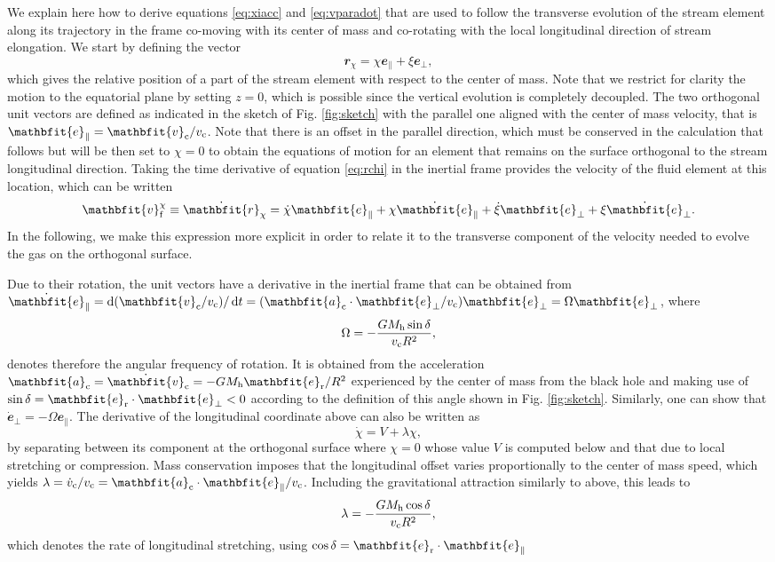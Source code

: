 \documentclass[a4paper,fleqn,usenatbib]{mnras}
\newcommand{\be}{\begin{equation}}
\newcommand{\ee}{\end{equation}}
\newcommand*\diff{\mathop{}\!\mathrm{d}}
\newcommand{\vect}[1]{\mathbfit{#1}}
\newcommand{\mh}{M_{\rm h}}
\begin{document}
We explain here how to derive equations \eqref{eq:xiacc} and \eqref{eq:vparadot} that are used to follow the transverse evolution of the stream element along its trajectory in the frame co-moving with its center of mass and co-rotating with the local longitudinal direction of stream elongation. We start by defining the vector
\be
\vect{r}_{\chi} = \chi \vect{e}_{\parallel} + \xi \vect{e}_{\perp},
\label{eq:rchi}
\ee
which gives the relative position of a part of the stream element with respect to the center of mass. Note that we restrict for clarity the motion to the equatorial plane by setting $z=0$, which is possible since the vertical evolution is completely decoupled. The two orthogonal unit vectors are defined as indicated in the sketch of Fig. \ref{fig:sketch} with the parallel one aligned with the center of mass velocity, that is $\vect{e}_{\parallel} = \vect{v}_{\rm c} / v_{\rm c}$. Note that there is an offset in the parallel direction, which must be conserved in the calculation that follows but will be then set to $\chi = 0$ to obtain the equations of motion for an element that remains on the surface orthogonal to the stream longitudinal direction. Taking the time derivative of equation \eqref{eq:rchi} in the inertial frame provides the velocity of the fluid element at this location, which can be written
\be
\vect{v}^{\chi}_{\rm f} \equiv \dot{\vect{r}}_{\chi} = \dot{\chi} \vect{e}_{\parallel} + \chi \dot{\vect{e}}_{\parallel} +  \dot{\xi} \vect{e}_{\perp} + \xi \dot{\vect{e}}_{\perp}.
\label{eq:vchif}
\ee
In the following, we make this expression more explicit in order to relate it to the transverse component of the velocity needed to evolve the gas on the orthogonal surface.

Due to their rotation, the unit vectors have a derivative in the inertial frame that can be obtained from $\dot{\vect{e}}_{\parallel} = \diff (\vect{v}_{\rm c} / v_{\rm c}) / \diff t =  (\vect{a}_{\rm c} \cdot \vect{e}_{\perp} / v_{\rm c}) \vect{e}_{\perp} = \Omega \vect{e}_{\perp}$, where 
\be
\Omega = -\frac{G \mh \sin \delta}{v_{\rm c} R^2},
\label{eq:omega}
\ee
denotes therefore the angular frequency of rotation. It is obtained from the acceleration $\vect{a}_{\rm c} = \dot{\vect{v}}_{\rm c} = -G \mh \vect{e}_{\rm r} / R^2$ experienced by the center of mass from the black hole and making use of $\sin \delta = \vect{e}_{\rm r}\cdot \vect{e}_{\perp}<0$ according to the definition of this angle shown in Fig. \ref{fig:sketch}. Similarly, one can show that $\dot{\vect{e}}_{\perp} = - \Omega \vect{e}_{\parallel}$. The derivative of the longitudinal coordinate above can also be written as
\be
\dot{\chi} = V + \lambda \chi,
\label{eq:chidot}
\ee
by separating between its component at the orthogonal surface where $\chi = 0$ whose value $V$ is computed below and that due to local stretching or compression. Mass conservation imposes that the longitudinal offset varies proportionally to the center of mass speed, which yields $\lambda = \dot{v}_{\rm c} /v_{\rm c} = \vect{a}_{\rm c} \cdot \vect{e}_{\parallel} / v_{\rm c}$. Including the gravitational attraction similarly to above, this leads to
\be
\lambda = -\frac{G \mh \cos \delta}{v_{\rm c} R^2},
\ee
which denotes the rate of longitudinal stretching, using $\cos \delta = \vect{e}_{\rm r}\cdot \vect{e}_{\parallel}$
\end{document}
